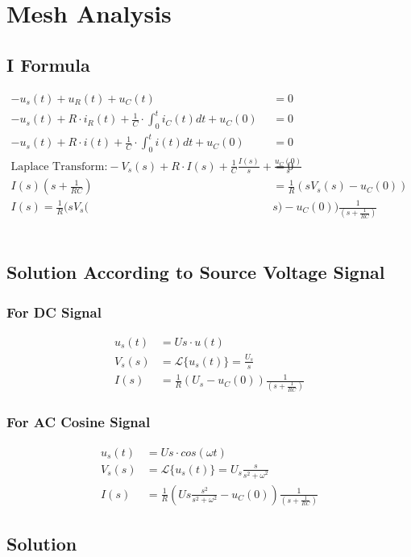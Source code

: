 \documentclass{article}
\begin{document}
\section{Mesh Analysis}
\subsection{I Formula}
\begin{align*}
    -u_s(t)+u_R(t)+u_C(t)&=0 \\
    -u_s(t)+R \cdot i_R(t) + \frac{1}{C}\cdot \int_{0}^{t}i_C(t)dt +u_C(0) &=0 \\
    -u_s(t)+R \cdot i(t) + \frac{1}{C}\cdot \int_{0}^{t}i(t)dt +u_C(0) &=0\\
    \text{Laplace Transform:}     -V_s(s)+R \cdot I(s) + \frac{1}{C} \frac{I(s)}{s} +\frac{u_C(0)}{s} &=0\\
    I(s) (s+ \frac{1}{RC}) &= \frac{1}{R} (s V_s(s) - u_C(0)) \\
    I(s) = \frac{1}{R} (s V_s(&s) - u_C(0))\frac{1}{(s+ \frac{1}{RC})}
\end{align*}\\

\subsection{Solution According to Source Voltage Signal}
\subsubsection{For DC Signal}
\begin{align*}
    u_s(t) &= Us \cdot u(t)\\
    V_s(s) &= \mathcal{L} \big\{u_s(t)\big\} = \frac{U_s}{s}\\
    I(s) &= \frac{1}{R} (U_s - u_C(0))\frac{1}{(s+ \frac{1}{RC})}
\end{align*}
\subsubsection{For AC Cosine Signal}
\begin{align*}
    u_s(t) &= Us \cdot cos(\omega t)\\
    V_s(s) &= \mathcal{L} \big\{u_s(t)\big\} =U_s \frac{s}{s^2+\omega^2}\\
    I(s) &= \frac{1}{R} (Us \frac{ s^2}{s^2+\omega^2} - u_C(0))\frac{1}{(s+ \frac{1}{RC})}
\end{align*}
\subsection{Solution}
\end{document}
